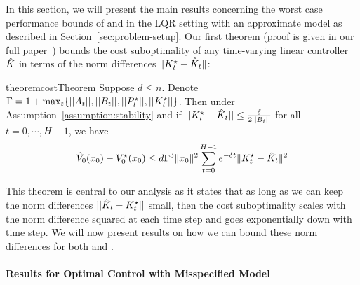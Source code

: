 In this section, we will present the main results concerning the worst
case performance bounds of \MM{} and \ILC{} in the LQR setting with an
approximate model as described in Section~\ref{sec:problem-setup}. Our
first theorem (proof is given in our full paper~\cite{DBLP:journals/corr/abs-2111-09434})
bounds the cost suboptimality of any time-varying linear 
controller $\hat{K}$ in terms of the norm differences $\|K^\star_t -
\hat{K}_t\|$:
\begin{restatable}{theorem}{costTheorem}
  \label{theorem:cost}
  Suppose $d \leq n$. Denote
  $\Gamma = 1 + \max_t\{||A_t||, ||B_t||, ||P^\star_t||, ||K^\star_t||\}$. Then under
  Assumption~\ref{assumption:stability} and if $||K^\star_{t} -
  \hat{K}_{t}|| \le \frac{\delta}{2||B_{i}||}$ for all $t=0, \cdots, H-1$, we have
  \begin{equation}
    \label{eq:cost}
    \hat{V}_0(x_0) - V^\star_0(x_0) \leq d\Gamma^{3}\|x_{0}\|^{2} \sum_{t=0}^{H-1} e^{-\delta t}\|K^\star_{t} - \hat{K}_{t}\|^{2}
  \end{equation}
\end{restatable}
This theorem is central to our analysis as it states that as long as we can keep
the norm differences $||\hat{K}_{t} - K^\star_{t}||$ small, then the cost
suboptimality scales 
with the norm difference squared at each time step and goes exponentially down
with time step. %
We will now present results on how we can
bound these norm differences for both \MM{} and \ILC{}.

\paragraph{Results for Optimal Control with Misspecified Model}
\label{sec:optimal-control-with}

